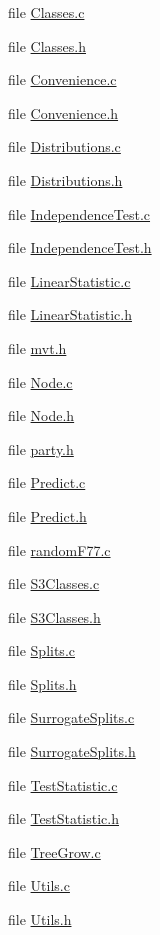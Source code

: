 \begin{CompactItemize}
\item 
file \hyperlink{Classes_8c}{Classes.c}
\item 
file \hyperlink{Classes_8h}{Classes.h}
\item 
file \hyperlink{Convenience_8c}{Convenience.c}
\item 
file \hyperlink{Convenience_8h}{Convenience.h}
\item 
file \hyperlink{Distributions_8c}{Distributions.c}
\item 
file \hyperlink{Distributions_8h}{Distributions.h}
\item 
file \hyperlink{IndependenceTest_8c}{Independence\-Test.c}
\item 
file \hyperlink{IndependenceTest_8h}{Independence\-Test.h}
\item 
file \hyperlink{LinearStatistic_8c}{Linear\-Statistic.c}
\item 
file \hyperlink{LinearStatistic_8h}{Linear\-Statistic.h}
\item 
file \hyperlink{mvt_8h}{mvt.h}
\item 
file \hyperlink{Node_8c}{Node.c}
\item 
file \hyperlink{Node_8h}{Node.h}
\item 
file \hyperlink{party_8h}{party.h}
\item 
file \hyperlink{Predict_8c}{Predict.c}
\item 
file \hyperlink{Predict_8h}{Predict.h}
\item 
file \hyperlink{randomF77_8c}{random\-F77.c}
\item 
file \hyperlink{S3Classes_8c}{S3Classes.c}
\item 
file \hyperlink{S3Classes_8h}{S3Classes.h}
\item 
file \hyperlink{Splits_8c}{Splits.c}
\item 
file \hyperlink{Splits_8h}{Splits.h}
\item 
file \hyperlink{SurrogateSplits_8c}{Surrogate\-Splits.c}
\item 
file \hyperlink{SurrogateSplits_8h}{Surrogate\-Splits.h}
\item 
file \hyperlink{TestStatistic_8c}{Test\-Statistic.c}
\item 
file \hyperlink{TestStatistic_8h}{Test\-Statistic.h}
\item 
file \hyperlink{TreeGrow_8c}{Tree\-Grow.c}
\item 
file \hyperlink{Utils_8c}{Utils.c}
\item 
file \hyperlink{Utils_8h}{Utils.h}
\end{CompactItemize}
